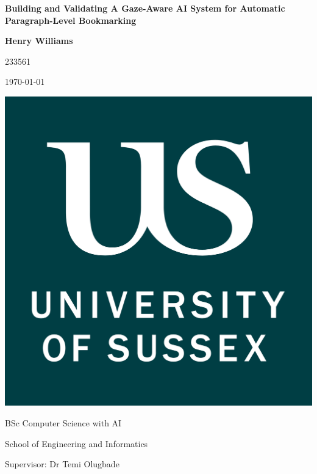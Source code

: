 \documentclass{report}
\title{\mytitle}
\author{\myauthor}
\date{\mydate}
\newcommand{\mytitle}{Building and Validating A Gaze-Aware AI System for Automatic Paragraph-Level Bookmarking}
\newcommand{\myauthor}{Henry Williams}
\newcommand{\mydate}{\today}
\begin{document}
\begin{titlepage}
    \begin{center}
        \vspace*{2cm}
        {\huge\textbf{\mytitle}}

        \vspace*{0.75cm}

        {\Large\textbf{\myauthor}

        233561

        \vspace*{0.5cm}

        \mydate}

        \vspace*{1cm}

        \includegraphics[scale=0.075]{../assets/UoS-logo.png}

        \vspace*{1.5cm}

        {\Large BSc Computer Science with AI }

        \vspace*{1.5cm}

        {\large School of Engineering and Informatics

        Supervisor: Dr Temi Olugbade}

        \vspace*{1.5cm}
        

\end{center}
\end{titlepage}
\end{document}
